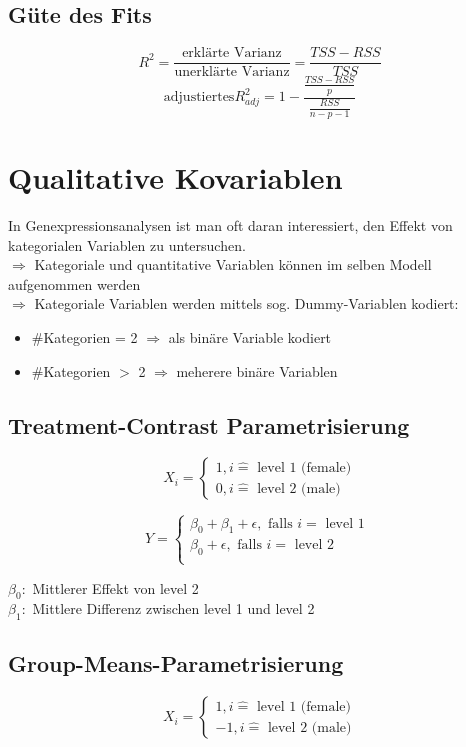 \documentclass[10pt]{report}
\theoremstyle{definition}
\begin{document}
\subsection{Güte des Fits}
\[ R^{2} = \frac{\text{erklärte Varianz}}{\text{unerklärte Varianz}} = \frac{TSS -RSS}{TSS} \]
\[ \text{adjustiertes} R_{adj}^{2} = 1 - \frac{\frac{TSS - RSS}{p}}{\frac{RSS}{n-p-1}} \]

\section{Qualitative Kovariablen}
In Genexpressionsanalysen ist man oft daran interessiert, den Effekt von kategorialen Variablen zu untersuchen.\\
$\Rightarrow$ Kategoriale und quantitative Variablen können im selben Modell aufgenommen werden \\
$\Rightarrow$ Kategoriale Variablen werden mittels sog. Dummy-Variablen kodiert:
	\begin{itemize}
		\item \#Kategorien = 2 $\Rightarrow$ als binäre Variable kodiert
		\item \#Kategorien $>$ 2 $\Rightarrow$ meherere binäre Variablen
	\end{itemize}

\subsection{Treatment-Contrast Parametrisierung}
\[ X_i = \begin{cases}
		1, i \hat{=} \text{ level 1 (female)} \\
		0, i \hat{=} \text{ level 2 (male)}
\end{cases} \]

\[ Y = \begin{cases}
		\beta_0 + \beta_1 + \epsilon, \text{ falls } i = \text{ level 1 } \\
		\beta_0 + \epsilon, \text{ falls } i = \text{ level 2 } \\
\end{cases} \]

$\beta_0:$ Mittlerer Effekt von level 2\\
$\beta_1:$ Mittlere Differenz zwischen level 1 und level 2\\

\subsection{Group-Means-Parametrisierung}
\[ X_i = \begin{cases}
		1, i \hat{=} \text{ level 1 (female)} \\
		-1, i \hat{=} \text{ level 2 (male)}
\end{cases} \]
\end{document}

